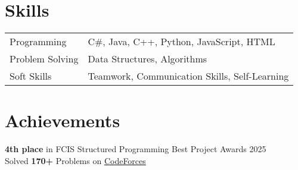 \documentclass[a4paper,12pt]{article}
\begin{document}
\section{Skills}
\begin{tabularx}{\linewidth}{@{}l X@{}}
Programming &  C\#, Java, C++, Python, JavaScript, HTML\\ 
Problem Solving &  Data Structures, Algorithms\\
Soft Skills & Teamwork, Communication Skills, Self-Learning
\end{tabularx}
\section{Achievements}
 \textbf{4th place} in FCIS Structured Programming Best Project Awards 2025\\
 Solved \textbf{170+} Problems on \href{https://codeforces.com/profile/MohamedEid311}{CodeForces}

\vfill
{}
\end{document}
